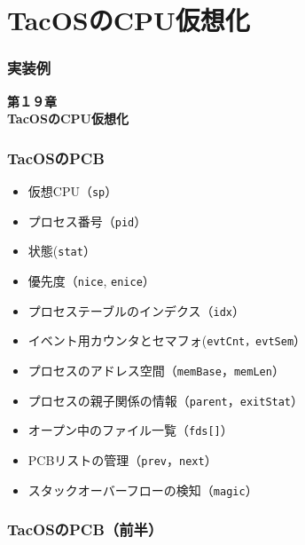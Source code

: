 \documentclass[unicode,handout]{beamer}                   %
\begin{document}
\section{TacOSのCPU仮想化}
\begin{frame}
  \frametitle{実装例}
  \vfill
  \begin{center}
    \textbf{\LARGE 第１９章} \\
    \textbf{\Huge TacOSのCPU仮想化}\\
    \vfill
  \end{center}
  \vfill
\end{frame}

\begin{frame}
  \frametitle{TacOSのPCB}
  \begin{itemize}
    \item 仮想CPU（\texttt{sp}）
    \item プロセス番号（\texttt{pid}）
    \item 状態(\texttt{stat}）
    \item 優先度（\texttt{nice}, \texttt{enice}）
    \item プロセステーブルのインデクス（\texttt{idx}）
    \item イベント用カウンタとセマフォ(\texttt{evtCnt，evtSem}）
    \item プロセスのアドレス空間（\texttt{memBase}，\texttt{memLen}）
    \item プロセスの親子関係の情報（\texttt{parent}，\texttt{exitStat}）
    \item オープン中のファイル一覧（\texttt{fds[]}）
    \item PCBリストの管理（\texttt{prev}，\texttt{next}）
    \item スタックオーバーフローの検知（\texttt{magic}）
  \end{itemize}
  \vfill
\end{frame}

\begin{frame}
  \frametitle{TacOSのPCB（前半）}
  \vspace{-5mm}
  \vfill
\end{frame}
\end{document}
